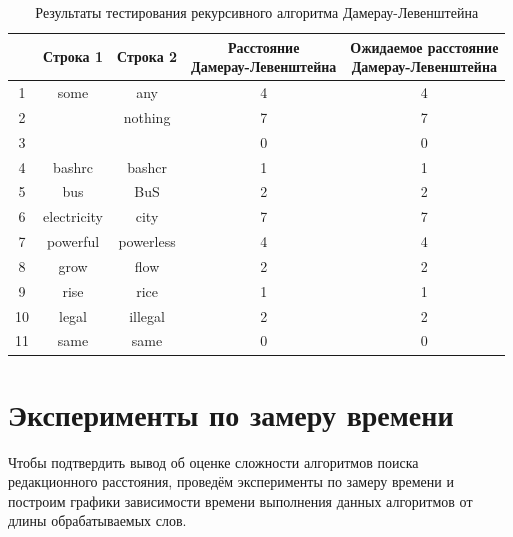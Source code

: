 \begin{table}[H]
    \caption{Результаты тестирования рекурсивного алгоритма Дамерау-Левенштейна}
	\begin{tabular}{|c|c|c|c|c|}
 	\hline
    \No{} & Строка 1 & Строка 2 & \makecell{Расстояние\\Дамерау-Левенштейна} & \makecell{Ожидаемое расстояние\\Дамерау-Левенштейна} \\
 	\hline
 	1 & some & any & 4 & 4\\
 	\hline
 	2 & & nothing & 7 & 7\\
 	\hline
 	3 & & & 0 & 0\\
 	\hline
 	4 & bashrc & bashcr & 1 & 1\\
 	\hline
 	5 & bus & BuS & 2 & 2\\
 	\hline
 	6 & electricity & city & 7 & 7\\
 	\hline
 	7 & powerful & powerless & 4 & 4\\
 	\hline
 	8 & grow & flow & 2 & 2\\
 	\hline
 	9 & rise & rice & 1 & 1\\
 	\hline
    10 & legal & illegal & 2 & 2\\
 	\hline
    11 & same & same & 0 & 0\\
    \hline
	\end{tabular}
\end{table}

\section{Эксперименты по замеру времени}
Чтобы подтвердить вывод об оценке сложности алгоритмов поиска редакционного расстояния, проведём эксперименты по замеру времени и построим графики зависимости времени выполнения данных алгоритмов от длины обрабатываемых слов.

